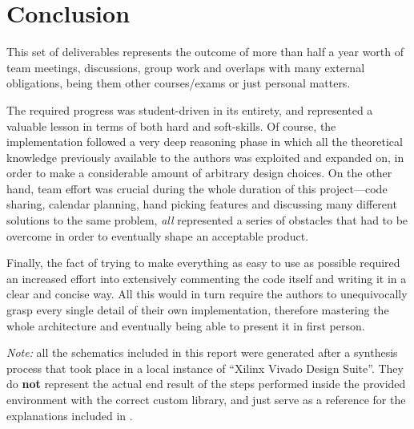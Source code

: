 \chapter{Conclusion}
\label{end}

This set of deliverables represents the outcome of more than half a year worth of team meetings, discussions, group work and overlaps with many external obligations, being them other courses/exams or just personal matters.

The required progress was student-driven in its entirety, and represented a valuable lesson in terms of both hard and soft-skills. Of course, the implementation followed a very deep reasoning phase in which all the theoretical knowledge previously available to the authors was exploited and expanded on, in order to make a considerable amount of arbitrary design choices. On the other hand, team effort was crucial during the whole duration of this project—code sharing, calendar planning, hand picking features and discussing many different solutions to the same problem, \emph{all} represented a series of obstacles that had to be overcome in order to eventually shape an acceptable product.

Finally, the fact of trying to make everything as easy to use as possible required an increased effort into extensively commenting the code itself and writing it in a clear and concise way. All this would in turn require the authors to unequivocally grasp every single detail of their own implementation, therefore mastering the whole architecture and eventually being able to present it in first person.

\vspace{\baselineskip}

\emph{Note:} all the schematics included in this report were generated after a synthesis process that took place in a local instance of ``Xilinx Vivado Design Suite''. They do \textbf{not} represent the actual end result of the steps performed inside the provided environment with the correct custom library, and just serve as a reference for the explanations included in  .